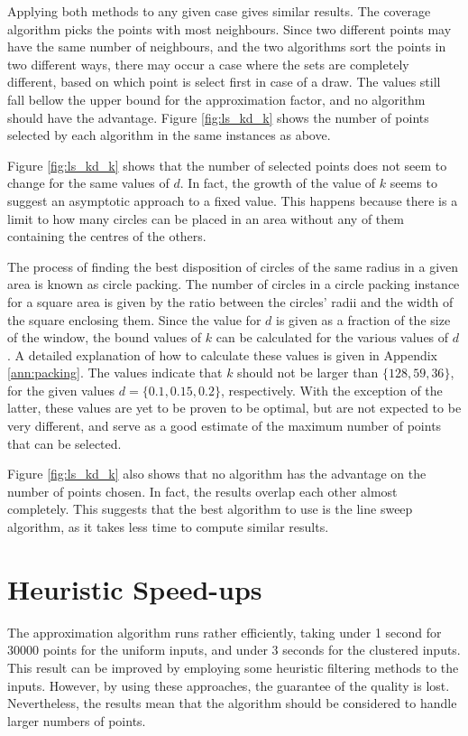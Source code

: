 Applying both methods to any given case gives similar results. The coverage algorithm picks the points with most neighbours. Since two different points may have the same number of neighbours, and the two algorithms sort the points in two different ways, there may occur a case where the sets are completely different, based on which point is select first in case of a draw. The values still fall bellow the upper bound for the approximation factor, and no algorithm should have the advantage. Figure \ref{fig:ls_kd_k} shows the number of points selected by each algorithm in the same instances as above.




\begin{change}
Figure \ref{fig:ls_kd_k} shows  that the number of selected points does not seem to change for the same values of $d$. In fact, the growth of the value of $k$ seems to suggest an asymptotic approach to a fixed value. This happens because there is a limit to how many circles can be placed in an area without any of them containing the centres of the others. 
	
The process of finding the best disposition of circles of the same radius in a given area is known as circle packing. The number of circles in a circle packing instance for a square area is given by the ratio between the circles' radii and the width of the square enclosing them. Since the value for $d$ is given as a fraction of the size of the window, the bound values of $k$ can be calculated for the various values of $d$. A detailed explanation of how to calculate these values is given in Appendix \ref{ann:packing}. The values indicate that $k$ should not be larger than $\{128,59,36\}$, for the given values $d=\{0.1,0.15,0.2\}$, respectively. With the exception of the latter, these values are yet to be proven to be optimal, but are not expected to be very different, and serve as a good estimate of the maximum number of points that can be selected.
\end{change}

Figure \ref{fig:ls_kd_k} also shows that no algorithm has the advantage on the number of points chosen. In fact, the results overlap each other almost completely. This suggests that the best algorithm to use is the line sweep algorithm, as it takes less time to compute similar results.


\section{Heuristic Speed-ups}
The approximation algorithm runs rather efficiently, taking under 1 second for 30000 points for the uniform inputs, and under 3 seconds for the clustered inputs. This result can be improved by employing some heuristic filtering methods to the inputs. However, by using these approaches, the guarantee of the quality is lost. Nevertheless, the results mean that the algorithm should be considered to handle larger numbers of points.
